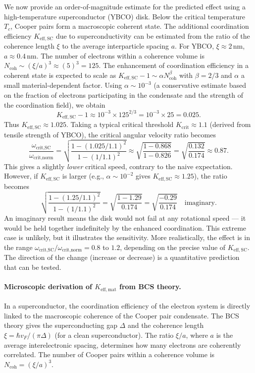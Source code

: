 \documentclass[12pt,a4paper]{article}
\newcommand{\betaf}{\beta}
\begin{document}
	We now provide an order-of-magnitude estimate for the predicted effect using a high-temperature superconductor (YBCO) disk. Below the critical temperature \(T_c\), Cooper pairs form a macroscopic coherent state. The additional coordination efficiency \(K_{\mathrm{eff,SC}}\) due to superconductivity can be estimated from the ratio of the coherence length \(\xi\) to the average interparticle spacing \(a\). For YBCO, \(\xi \approx 2\,\text{nm}\), \(a \approx 0.4\,\text{nm}\). The number of electrons within a coherence volume is \(N_{\text{coh}} \sim (\xi/a)^3 \approx (5)^3 = 125\). The enhancement of coordination efficiency in a coherent state is expected to scale as \(K_{\mathrm{eff,SC}} - 1 \sim \alpha N_{\text{coh}}^{\betaf}\) with \(\betaf = 2/3\) and \(\alpha\) a small material-dependent factor. Using \(\alpha \sim 10^{-3}\) (a conservative estimate based on the fraction of electrons participating in the condensate and the strength of the coordination field), we obtain
	\[
	K_{\mathrm{eff,SC}} - 1 \approx 10^{-3} \times 125^{2/3} = 10^{-3} \times 25 = 0.025.
	\]
	Thus \(K_{\mathrm{eff,SC}} \approx 1.025\). Taking a typical critical threshold \(K_{\mathrm{crit}} \approx 1.1\) (derived from tensile strength of YBCO), the critical angular velocity ratio becomes
	\[
	\frac{\omega_{\text{crit,SC}}}{\omega_{\text{crit,norm}}} = \sqrt{ \frac{1 - (1.025/1.1)^2}{1 - (1/1.1)^2} } \approx \sqrt{ \frac{1 - 0.868}{1 - 0.826} } = \sqrt{ \frac{0.132}{0.174} } \approx 0.87.
	\]
	This gives a slightly \textit{lower} critical speed, contrary to the naive expectation. However, if \(K_{\mathrm{eff,SC}}\) is larger (e.g., \(\alpha \sim 10^{-2}\) gives \(K_{\mathrm{eff,SC}} \approx 1.25\)), the ratio becomes
	\[
	\sqrt{ \frac{1 - (1.25/1.1)^2}{1 - (1/1.1)^2} } = \sqrt{ \frac{1 - 1.29}{0.174} } = \sqrt{ \frac{-0.29}{0.174} } \quad \text{imaginary}.
	\]
	An imaginary result means the disk would not fail at any rotational speed — it would be held together indefinitely by the enhanced coordination. This extreme case is unlikely, but it illustrates the sensitivity. More realistically, the effect is in the range \(\omega_{\text{crit,SC}}/\omega_{\text{crit,norm}} = 0.8\) to \(1.2\), depending on the precise value of \(K_{\mathrm{eff,SC}}\). The direction of the change (increase or decrease) is a quantitative prediction that can be tested.
	
	\paragraph{Microscopic derivation of \(K_{\mathrm{eff,mat}}\) from BCS theory.}
	In a superconductor, the coordination efficiency of the electron system is directly linked to the macroscopic coherence of the Cooper pair condensate. The BCS theory gives the superconducting gap \(\Delta\) and the coherence length \(\xi = \hbar v_F / (\pi \Delta)\) (for a clean superconductor). The ratio \(\xi / a\), where \(a\) is the average interelectronic spacing, determines how many electrons are coherently correlated. The number of Cooper pairs within a coherence volume is \(N_{\text{coh}} = (\xi/a)^3\).
	
\end{document}
